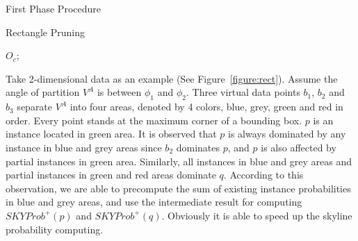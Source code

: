 \begin{algorithm}[htp]

    \BlankLine 
    \BlankLine 

  \setcounter{AlgoLine}{0}
  \caption{First Phase Procedure}
\end{algorithm}


\begin{algorithm}[!t]
\label{RectanvlePruning} 
\caption{Rectangle Pruning}


\BlankLine 

\Return $O_c$;

\end{algorithm}


Take 2-dimensional data as an example (See Figure~\ref{figure:rect}). Assume the angle of partition $V^A$ is between $\phi_1$ and $\phi_2$. Three virtual data points $b_1$, $b_2$ and $b_3$ separate $V^A$ into four areas, denoted by 4 colors, blue, grey, green and red in order. Every point stands at the maximum corner of a bounding box. $p$ is an instance located in green area. It is observed that $p$ is always dominated by any instance in blue and grey areas since $b_2$ dominates $p$, and $p$ is also affected by partial instances in green area. Similarly, all instances in blue and grey areas and partial instances in green and red areas dominate $q$. According to this observation, we are able to precompute the sum of existing instance probabilities in blue and grey areas, and use the intermediate result for computing $SKYProb^{+}(p)$ and $SKYProb^{+}(q)$. Obviously it is able to speed up the skyline probability computing. 

